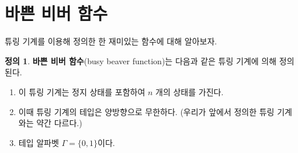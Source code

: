 \documentclass[b5paper]{book}
\theoremstyle{definition}
\newtheorem{defn}{정의}[chapter]
\begin{document}
\section{바쁜 비버 함수}
튜링 기계를 이용해 정의한 한 재미있는 함수에 대해 알아보자.
\begin{defn}
    \textbf{바쁜 비버 함수}(busy beaver function)는 다음과 같은 튜링 기계에 의해 정의된다.
    \begin{enumerate}
        \item 이 튜링 기계는 정지 상태를 포함하여 $n$ 개의 상태를 가진다.
        \item 이때 튜링 기계의 테입은 양방향으로 무한하다. (우리가 앞에서 정의한 
        튜링 기계와는 약간 다르다.)
        \item 테입 알파벳 $\Gamma = \{0, 1\}$이다.
    \end{enumerate}
\end{defn}
\end{document}
